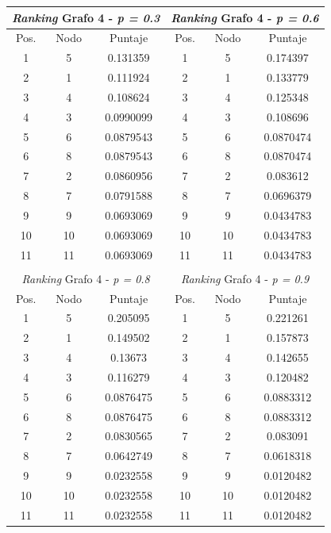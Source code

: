 \begin{center}
         \begin{tabular}{|c|c|c||c|c|c|}
                    \hline
                    \multicolumn{3}{|c||}{\emph{Ranking} Grafo 4 - \emph{p = 0.3}} & \multicolumn{3}{c|}{\emph{Ranking} Grafo 4 - \emph{p = 0.6}} \\ \hline
                    Pos. & Nodo & Puntaje    & Pos. & Nodo & Puntaje  \\ \hline
1 & 5 & 0.131359 & 1 & 5 & 0.174397 \\ 
2 & 1 & 0.111924 & 2 & 1 & 0.133779 \\
3 & 4 & 0.108624  & 3 & 4 & 0.125348 \\
4 & 3 & 0.0990099  & 4 & 3 & 0.108696 \\
5 &  6 & 0.0879543 & 5 & 6 & 0.0870474 \\
6 & 8 & 0.0879543  & 6 & 8 & 0.0870474 \\
7 & 2 & 0.0860956  & 7 & 2 & 0.083612 \\
8 &  7 & 0.0791588 & 8 & 7 & 0.0696379 \\
9 &  9 & 0.0693069 & 9 & 9 & 0.0434783 \\
10 & 10 & 0.0693069  & 10 & 10 & 0.0434783\\
11 & 11 & 0.0693069  & 11 & 11 & 0.0434783 \\ \hline
                    \multicolumn{6}{c}{} \\ \hline
                    \multicolumn{3}{|c||}{\emph{Ranking} Grafo 4 - \emph{p = 0.8}} & \multicolumn{3}{c|}{\emph{Ranking} Grafo 4 - \emph{p = 0.9}} \\ \hline
                    Pos. & Nodo & Puntaje    & Pos. & Nodo & Puntaje  \\ \hline
1 & 5 & 0.205095 & 1 & 5 & 0.221261 \\ 
2 & 1 & 0.149502 & 2 & 1 & 0.157873 \\
3 & 4 & 0.13673  & 3 & 4 & 0.142655 \\
4 & 3 & 0.116279  & 4 & 3 & 0.120482 \\
5 &  6 & 0.0876475 & 5 & 6 & 0.0883312 \\
6 & 8 & 0.0876475 & 6 & 8 & 0.0883312 \\
7 & 2 & 0.0830565  & 7 & 2 & 0.083091 \\
8 &  7 & 0.0642749 & 8 & 7 & 0.0618318 \\
9 &  9 & 0.0232558& 9 & 9 & 0.0120482 \\
10 & 10 & 0.0232558  & 10 & 10 & 0.0120482\\
11 & 11 & 0.0232558  & 11 & 11 & 0.0120482 \\ \hline

                \end{tabular}
            \end{center}


